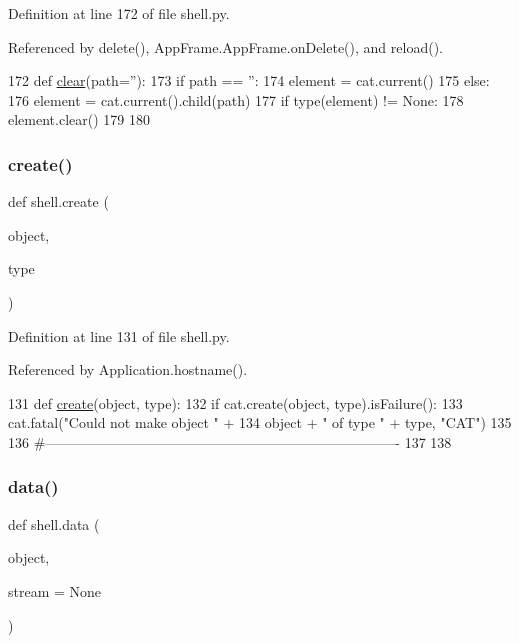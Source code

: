 Definition at line 172 of file shell.\+py.



Referenced by delete(), App\+Frame.\+App\+Frame.\+on\+Delete(), and reload().


\begin{DoxyCode}
172 \textcolor{keyword}{def }\hyperlink{namespaceshell_a14da1173b3cc5b8569cc0020130e3bd7}{clear}(path=''):
173   \textcolor{keywordflow}{if} path == \textcolor{stringliteral}{''}:
174     element = cat.current()
175   \textcolor{keywordflow}{else}:
176     element = cat.current().child(path)
177   \textcolor{keywordflow}{if} type(element) != \textcolor{keywordtype}{None}:
178     element.clear()
179 
180 
\end{DoxyCode}
\mbox{\label{namespaceshell_a4e7ade568694b57b3284d8b323ac9ecd}} 
\subsubsection{\texorpdfstring{create()}{create()}}
{\footnotesize\ttfamily def shell.\+create (\begin{DoxyParamCaption}\item[{}]{object,  }\item[{}]{type }\end{DoxyParamCaption})}



Definition at line 131 of file shell.\+py.



Referenced by Application.\+hostname().


\begin{DoxyCode}
131 \textcolor{keyword}{def }\hyperlink{namespaceshell_a4e7ade568694b57b3284d8b323ac9ecd}{create}(object, type):
132   \textcolor{keywordflow}{if} cat.create(object, type).isFailure():
133     cat.fatal(\textcolor{stringliteral}{"Could not make object "} +
134               object + \textcolor{stringliteral}{" of type "} + type, \textcolor{stringliteral}{"CAT"})
135 
136 \textcolor{comment}{#----------------------------------------------------------------------------}
137 
138 
\end{DoxyCode}
\mbox{\label{namespaceshell_a5ea2525995cedc3efd69ea8a7f034d1e}} 
\subsubsection{\texorpdfstring{data()}{data()}}
{\footnotesize\ttfamily def shell.\+data (\begin{DoxyParamCaption}\item[{}]{object,  }\item[{}]{stream = {\ttfamily None} }\end{DoxyParamCaption})}



